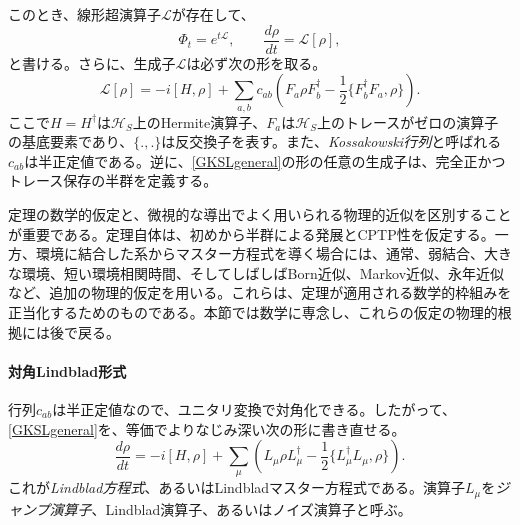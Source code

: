 \documentclass[a4paper,11pt,oneside]{article}
\theoremstyle{definition}
\numberwithin{equation}{section}
\begin{document}
このとき、線形超演算子$\mathcal L$が存在して、
\begin{equation}
\Phi_t = e^{t\mathcal L} ,
\qquad
\frac{d\rho}{dt} = \mathcal L[\rho] ,
\end{equation}
と書ける。さらに、生成子$\mathcal L$は必ず次の形を取る。
\begin{equation}\label{GKSLgeneral}
\mathcal L[\rho]
=
-i[H,\rho]
+
\sum_{a,b} c_{ab}
\left(
F_a \rho F_b^\dagger
-\frac12 \{F_b^\dagger F_a,\rho\}
\right) .
\end{equation}
ここで$H=H^\dagger$は$\mathcal H_S$上のHermite演算子、$ F_a$は$\mathcal H_S$上のトレースがゼロの演算子の基底要素であり、$ \{ .,.\}$は反交換子を表す。また、\textit{Kossakowski行列}と呼ばれる$c_{ab}$は半正定値である。逆に、\eqref{GKSLgeneral}の形の任意の生成子は、完全正かつトレース保存の半群を定義する。





定理の数学的仮定と、微視的な導出でよく用いられる物理的近似を区別することが重要である。定理自体は、初めから半群による発展とCPTP性を仮定する。一方、環境に結合した系からマスター方程式を導く場合には、通常、弱結合、大きな環境、短い環境相関時間、そしてしばしばBorn近似、Markov近似、永年近似など、追加の物理的仮定を用いる。これらは、定理が適用される数学的枠組みを正当化するためのものである。本節では数学に専念し、これらの仮定の物理的根拠には後で戻る。



\paragraph{対角Lindblad形式} 行列$c_{ab}$は半正定値なので、ユニタリ変換で対角化できる。したがって、\eqref{GKSLgeneral}を、等価でよりなじみ深い次の形に書き直せる。
\begin{equation}\label{Lindbladform}
\frac{d\rho}{dt}
=
-i[H,\rho]
+
\sum_\mu
\left(
L_\mu \rho L_\mu^\dagger
-\frac12 \{L_\mu^\dagger L_\mu,\rho\}
\right) .
\end{equation}
これが\textit{Lindblad方程式}、あるいはLindbladマスター方程式である。演算子$L_\mu$を\textit{ジャンプ演算子}、Lindblad演算子、あるいはノイズ演算子と呼ぶ。
\end{document}
